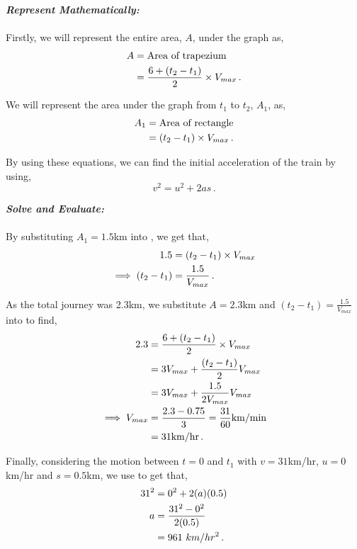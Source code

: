 \begin{subquestions}
\begin{subsubquestions}
\textbf{\textit{Represent Mathematically:}} \\ \\
Firstly, we will represent the entire area, $A$, under the graph as,
\begin{align}
	A & = \text{Area of trapezium} \nonumber \\
	  & = \frac{6 + (t_2-t_1)}{2}\times V_{max} \,. \label{2011:q6:AEqn1}
\end{align}   
	
We will represent the area under the graph from $t_1$ to $t_2$, $A_1$, as,
\begin{align}
	A_1 & = \text{Area of rectangle} \nonumber \\
	& = (t_2-t_1)\times V_{max} \,. \label{2011:q6:AEqn2}
\end{align}  
	
By using these equations, we can find the initial acceleration of the train by using,
\begin{equation}
	v^2 = u^2 + 2as  \label{2011:q6:AEqn3} \,. 
\end{equation} 



\textbf{\textit{Solve and Evaluate:}} \\ \\
By substituting $A_1=1.5$km into , we get that,
\begin{align}
	1.5 & = (t_2-t_1)\times V_{max} \nonumber \\
	\implies (t_2-t_1) & = \frac{1.5}{V_{max}} \,.
\end{align}

As the total journey was 2.3km, we substitute $A=2.3$km and $(t_2-t_1) = \frac{1.5}{V_{max}}$ into  to find,
\begin{align}
	2.3 & = \frac{6 + (t_2-t_1)}{2}\times V_{max} \nonumber \\
		& = 3V_{max} + \frac{(t_2-t_1)}{2}V_{max} \nonumber \\
		& = 3V_{max} + \frac{1.5}{2V_{max}}V_{max} \nonumber \\
		\implies V_{max} & = \frac{2.3-0.75}{3} = \frac{31}{60} \text{km/min} \nonumber \\
		               & = 31\text{km/hr} \,.
\end{align}

Finally, considering the motion between $t=0$ and $t_1$ with $v=31$km/hr, $u=0$km/hr and $s=0.5$km, we use  to get that,
\begin{align}
	31^2 & = 0^2 + 2(a)(0.5) \nonumber \\
	a & = \frac{31^2-0^2}{2(0.5)} \nonumber \\
	  & = 961 ~km/hr^2 \,.
\end{align}


\end{subsubquestions}
\end{subquestions}
